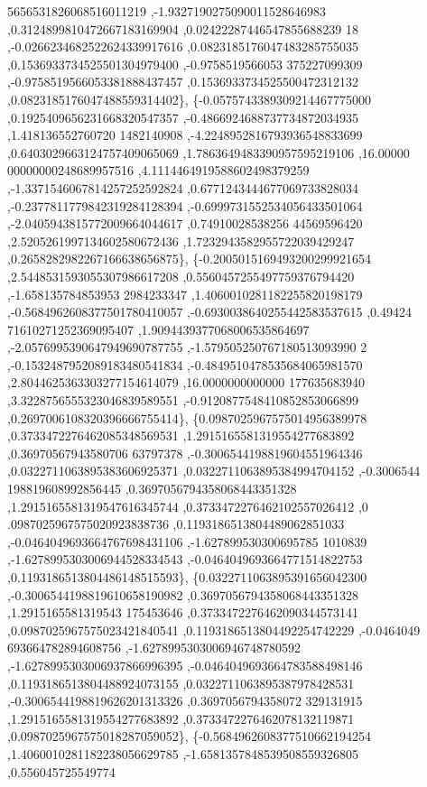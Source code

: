 \begin{DoxyCode}
      5656531826068516011219 ,-1.9327190275090011528646983 ,0.3124899810472667183169904 ,0.02422287446547855688239
      18 ,-0.0266234682522624339917616 ,0.0823185176047483285755035 ,0.1536933734525501304979400 ,-0.9758519566053
      375227099309 ,-0.9758519566053381888437457 ,0.1536933734525500472312132 ,0.0823185176047488559314402\},
\{-0.0575743389309214467775000 ,0.1925409656231668320547357 ,-0.4866924688737734872034935 ,1.418136552760720
      1482140908 ,-4.2248952816793936548833699 ,0.6403029663124757409065069 ,1.7863649483390957595219106 ,16.00000
      00000000248689957516 ,4.1114464919588602498379259 ,-1.3371546067814257252592824 ,0.6771243444677069733828034
       ,-0.2377811779842319284128394 ,-0.6999731552534056433501064 ,-2.0405943815772009664044617 ,0.74910028538256
      44569596420 ,2.5205261997134602580672436 ,1.7232943582955722039429247 ,0.2658282982267166638656875\},
\{-0.2005015169493200299921654 ,2.5448531593055307986617208 ,0.5560457255497759376794420 ,-1.658135784853953
      2984233347 ,1.4060010281182255820198179 ,-0.5684962608377501780410057 ,-0.6930038640255442583537615 ,0.49424
      71610271252369095407 ,1.9094439377068006535864697 ,-2.0576995390647949690787755 ,-1.579505250767180513093990
      2 ,-0.1532487952089183480541834 ,-0.4849510478535684065981570 ,2.8044625363303277154614079 ,16.0000000000000
      177635683940 ,3.3228756555323046839589551 ,-0.9120877548410852853066899 ,0.2697006108320396666755414\},
\{0.0987025967575014956389978 ,0.3733472276462085348569531 ,1.2915165581319554277683892 ,0.36970567943580706
      63797378 ,-0.3006544198819604551964346 ,0.0322711063895383606925371 ,0.0322711063895384994704152 ,-0.3006544
      198819608992856445 ,0.3697056794358068443351328 ,1.2915165581319547616345744 ,0.3733472276462102557026412 ,0
      .0987025967575020923838736 ,0.1193186513804489062851033 ,-0.0464049693664767698431106 ,-1.627899530300695785
      1010839 ,-1.6278995303006944528334543 ,-0.0464049693664771514822753 ,0.1193186513804486148515593\},
\{0.0322711063895391656042300 ,-0.3006544198819610658190982 ,0.3697056794358068443351328 ,1.2915165581319543
      175453646 ,0.3733472276462090344573141 ,0.0987025967575023421840541 ,0.1193186513804492254742229 ,-0.0464049
      693664782894608756 ,-1.6278995303006946748780592 ,-1.6278995303006937866996395 ,-0.0464049693664783588498146
       ,0.1193186513804488924073155 ,0.0322711063895387978428531 ,-0.3006544198819626201313326 ,0.3697056794358072
      329131915 ,1.2915165581319554277683892 ,0.3733472276462078132119871 ,0.0987025967575018287059052\},
\{-0.5684962608377510662194254 ,1.4060010281182238056629785 ,-1.6581357848539508559326805 ,0.556045725549774

\end{DoxyCode}
